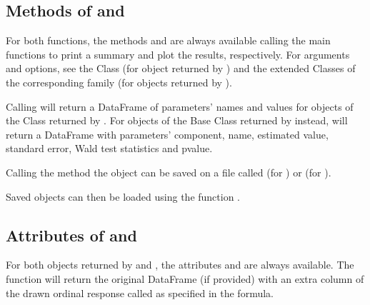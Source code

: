 \documentclass[letterpaper,10pt,english]{sphinxmanual}
\begin{document}
\subsection{Methods of  and }
\label{\detokenize{manual:methods-of-estimate-and-draw}}
\sphinxAtStartPar
For both functions, the methods  and  are always available calling the
main functions to print a summary and plot the results, respectively. For  arguments
and options, see the  Class (for object returned by )
and the extended  Classes of the corresponding
family (for objects returned by ).

\sphinxAtStartPar
Calling  will return a DataFrame of parameters’ names and values for objects
of the Class  returned by . For objects of the Base Class  returned
by  instead, will return a DataFrame with parameters’ component, name, estimated value,
standard error, Wald test statistics and p\sphinxhyphen{}value.

\sphinxAtStartPar
Calling the method  the object can be saved on a file called 
(for ) or  (for ).

\sphinxAtStartPar
Saved objects can then be loaded using the function .


\subsection{Attributes of  and }
\label{\detokenize{manual:attributes-of-estimate-and-draw}}
\sphinxAtStartPar
For both objects returned by  and , the attributes  and
 are always available. The function  will return the original DataFrame (if provided)
with an extra column of the drawn ordinal response called as specified in the formula.
\end{document}
